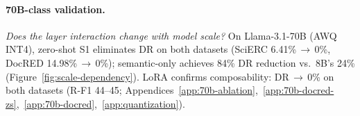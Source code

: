 \begin{table}[t]
\centering
\small
\setlength{\tabcolsep}{3pt}
%
\caption{Fine-tuning composability: LoRA $\times$ unconstrained vs.\ S1 on SciERC (551 docs) and DocRED (998 dev docs).
F1 (\%). No $\Delta$R-F1 is significant (Bonferroni-corrected; details in text); all DR reductions are ($p{<}0.001$; power analysis in Appendix~\ref{app:power-analysis-full}).
E-F1 (entity F1) includes parse-failure documents (Qwen PF (parse failure): 7--8\%; Llama PF: 2--3\%).}
\label{tab:composability}
\end{table}

\paragraph{70B-class validation.}
\label{sec:70b-results}
\emph{Does the layer interaction change with model scale?}
On Llama-3.1-70B (AWQ INT4), zero-shot S1 eliminates DR on both datasets (SciERC 6.41\%\,$\to$\,0\%, DocRED 14.98\%\,$\to$\,0\%); semantic-only achieves 84\% DR reduction vs.\ 8B's 24\% (Figure~\ref{fig:scale-dependency}).
LoRA confirms composability: DR\,$\to$\,0\% on both datasets (R-F1 44--45; Appendices~\ref{app:70b-ablation},~\ref{app:70b-docred-zs},~\ref{app:70b-docred},~\ref{app:quantization}).

